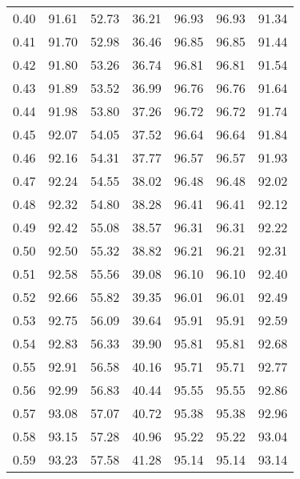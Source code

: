\begin{tabular}{|c|c|c|c|c|c|c|}
      0.40 &     91.61 &     52.73 &      36.21 &   96.93 &      96.93 &         91.34 \\
      0.41 &     91.70 &     52.98 &      36.46 &   96.85 &      96.85 &         91.44 \\
      0.42 &     91.80 &     53.26 &      36.74 &   96.81 &      96.81 &         91.54 \\
      0.43 &     91.89 &     53.52 &      36.99 &   96.76 &      96.76 &         91.64 \\
      0.44 &     91.98 &     53.80 &      37.26 &   96.72 &      96.72 &         91.74 \\
      0.45 &     92.07 &     54.05 &      37.52 &   96.64 &      96.64 &         91.84 \\
      0.46 &     92.16 &     54.31 &      37.77 &   96.57 &      96.57 &         91.93 \\
      0.47 &     92.24 &     54.55 &      38.02 &   96.48 &      96.48 &         92.02 \\
      0.48 &     92.32 &     54.80 &      38.28 &   96.41 &      96.41 &         92.12 \\
      0.49 &     92.42 &     55.08 &      38.57 &   96.31 &      96.31 &         92.22 \\
      0.50 &     92.50 &     55.32 &      38.82 &   96.21 &      96.21 &         92.31 \\
      0.51 &     92.58 &     55.56 &      39.08 &   96.10 &      96.10 &         92.40 \\
      0.52 &     92.66 &     55.82 &      39.35 &   96.01 &      96.01 &         92.49 \\
      0.53 &     92.75 &     56.09 &      39.64 &   95.91 &      95.91 &         92.59 \\
      0.54 &     92.83 &     56.33 &      39.90 &   95.81 &      95.81 &         92.68 \\
      0.55 &     92.91 &     56.58 &      40.16 &   95.71 &      95.71 &         92.77 \\
      0.56 &     92.99 &     56.83 &      40.44 &   95.55 &      95.55 &         92.86 \\
      0.57 &     93.08 &     57.07 &      40.72 &   95.38 &      95.38 &         92.96 \\
      0.58 &     93.15 &     57.28 &      40.96 &   95.22 &      95.22 &         93.04 \\
      0.59 &     93.23 &     57.58 &      41.28 &   95.14 &      95.14 &         93.14 \\

\end{tabular}
